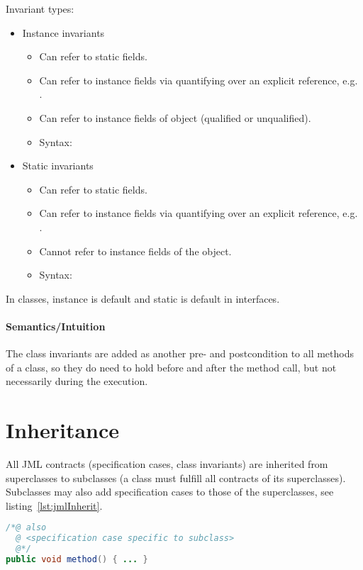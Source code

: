 			Invariant types:
			\begin{itemize}
				\item Instance invariants
					\begin{itemize}
						\item Can refer to static fields.
						\item Can refer to instance fields via quantifying over an explicit reference, e.g. .
						\item Can refer to instance fields of  object (qualified or unqualified).
						\item Syntax: 
					\end{itemize}
				\item Static invariants
					\begin{itemize}
						\item Can refer to static fields.
						\item Can refer to instance fields via quantifying over an explicit reference, e.g. .
						\item Cannot refer to instance fields of the object.
						\item Syntax: 
					\end{itemize}
			\end{itemize}
			In classes, instance is default and static is default in interfaces.
			
			\paragraph{Semantics/Intuition}
				The class invariants are added as another pre- and postcondition to all methods of a class, so they do need to hold before and after the method call, but not necessarily during the execution.

	\section{Inheritance}
		All JML contracts (specification cases, class invariants) are inherited from superclasses to subclasses (a class must fulfill all contracts of its superclasses). Subclasses may also add specification cases to those of the superclasses, see listing~\ref{lst:jmlInherit}.
		
		\begin{lstlisting}[caption = { Inheritance in JML }, label = lst:jmlInherit, language = Java]
/*@ also
  @ <specification case specific to subclass>
  @*/
public void method() { ... }
		\end{lstlisting}

